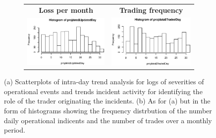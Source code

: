 \documentclass[]{article}
\begin{document}
\begin{figure}
\begin{subfigure}[b]{0.55\textwidth}
   \begin{frame}
      \centering
       \begin{tabular}{cc}
        \textbf{Loss per month} & \textbf{Trading frequency} \\
        \includegraphics[width=7.5cm]{UpdatedDayFreq.eps}
         &
         \includegraphics[width=7cm]{TradedDayFreq.eps}
         \end{tabular}
    \end{frame}
   \label{Hist_Loss_Freq}
\end{subfigure}
\caption[Numerical grid display]{(a) Scatterplots of intra-day trend analysis for logs of severities of operational events and trends incident activity for identifying the role of the trader originating the incidents. (b) As for (a) but in the form of histograms showing the frequency distrbution of the number daily operational indicents and the number of trades over a monthly period.} 
\end{figure}

\singlespacing
\end{document}
